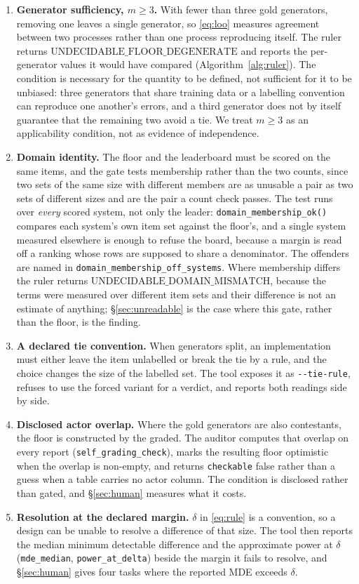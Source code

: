 \documentclass{article}
\newcommand{\ids}[1]{\texttt{\small #1}} %
\begin{document}
\begin{enumerate}[leftmargin=*, itemsep=1pt]
\item \textbf{Generator sufficiency, $m \ge 3$.} With fewer than three gold generators, removing one leaves a single generator, so \eqref{eq:loo} measures agreement between two processes rather than one process reproducing itself. The ruler returns $\mathrm{UNDECIDABLE\_FLOOR\_DEGENERATE}$ and reports the per-generator values it would have compared (Algorithm~\ref{alg:ruler}). The condition is necessary for the quantity to be defined, not sufficient for it to be unbiased: three generators that share training data or a labelling convention can reproduce one another's errors, and a third generator does not by itself guarantee that the remaining two avoid a tie. We treat $m\ge3$ as an applicability condition, not as evidence of independence.
\item \textbf{Domain identity.} The floor and the leaderboard must be scored on the same items, and the gate tests membership rather than the two counts, since two sets of the same size with different members are as unusable a pair as two sets of different sizes and are the pair a count check passes. The test runs over \emph{every} scored system, not only the leader: \ids{domain\_membership\_ok()} compares each system's own item set against the floor's, and a single system measured elsewhere is enough to refuse the board, because a margin is read off a ranking whose rows are supposed to share a denominator. The offenders are named in \texttt{domain\_membership\_off\_systems}. Where membership differs the ruler returns $\mathrm{UNDECIDABLE\_DOMAIN\_MISMATCH}$, because the terms were measured over different item sets and their difference is not an estimate of anything; \S\ref{sec:unreadable} is the case where this gate, rather than the floor, is the finding.
\item \textbf{A declared tie convention.} When generators split, an implementation must either leave the item unlabelled or break the tie by a rule, and the choice changes the size of the labelled set. The tool exposes it as \texttt{-{}-tie-rule}, refuses to use the forced variant for a verdict, and reports both readings side by side.
\item \textbf{Disclosed actor overlap.} Where the gold generators are also contestants, the floor is constructed by the graded. The auditor computes that overlap on every report (\mbox{\ids{self\_grading\_check}}), marks the resulting floor optimistic when the overlap is non-empty, and returns \ids{checkable} false rather than a guess when a table carries no actor column. The condition is disclosed rather than gated, and \S\ref{sec:human} measures what it costs.
\item \textbf{Resolution at the declared margin.} $\delta$ in \eqref{eq:rule} is a convention, so a design can be unable to resolve a difference of that size. The tool then reports the median minimum detectable difference and the approximate power at $\delta$ (\ids{mde\_median}, \ids{power\_at\_delta}) beside the margin it fails to resolve, and \S\ref{sec:human} gives four tasks where the reported MDE exceeds $\delta$.
\end{enumerate}
\end{document}
